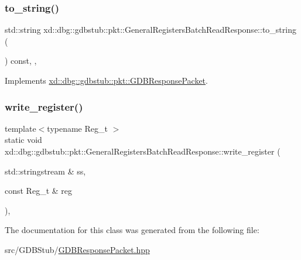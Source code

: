 \subsubsection{\texorpdfstring{to\+\_\+string()}{to\_string()}}
{\footnotesize\ttfamily std\+::string xd\+::dbg\+::gdbstub\+::pkt\+::\+General\+Registers\+Batch\+Read\+Response\+::to\+\_\+string (\begin{DoxyParamCaption}{ }\end{DoxyParamCaption}) const\hspace{0.3cm}{\ttfamily [inline]}, {\ttfamily [override]}, {\ttfamily [virtual]}}



Implements \mbox{\hyperlink{classxd_1_1dbg_1_1gdbstub_1_1pkt_1_1_g_d_b_response_packet_a2a15795536cd5ff94f0533c406233874}{xd\+::dbg\+::gdbstub\+::pkt\+::\+G\+D\+B\+Response\+Packet}}.

\mbox{\label{classxd_1_1dbg_1_1gdbstub_1_1pkt_1_1_general_registers_batch_read_response_a0c05faaa9a29a87d73c318f811739c88}} 
\subsubsection{\texorpdfstring{write\+\_\+register()}{write\_register()}}
{\footnotesize\ttfamily template$<$typename Reg\+\_\+t $>$ \\
static void xd\+::dbg\+::gdbstub\+::pkt\+::\+General\+Registers\+Batch\+Read\+Response\+::write\+\_\+register (\begin{DoxyParamCaption}\item[{std\+::stringstream \&}]{ss,  }\item[{const Reg\+\_\+t \&}]{reg }\end{DoxyParamCaption})\hspace{0.3cm}{\ttfamily [inline]}, {\ttfamily [static]}}



The documentation for this class was generated from the following file\+:\begin{DoxyCompactItemize}
\item 
src/\+G\+D\+B\+Stub/\mbox{\hyperlink{_g_d_b_response_packet_8hpp}{G\+D\+B\+Response\+Packet.\+hpp}}\end{DoxyCompactItemize}
